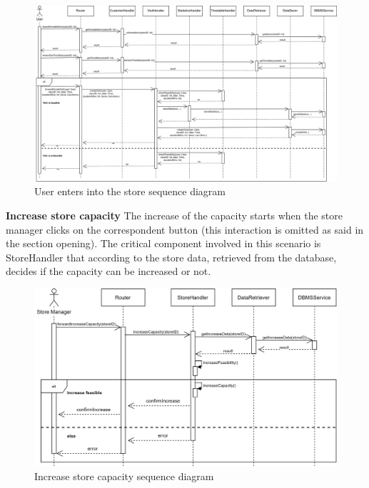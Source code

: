 \documentclass[]{article}
\begin{document}
	\begin{figure}[H]
		\centering
		\includegraphics[scale=0.57]{ComponentView/bookAVisitRuntimeView.png}
		\caption{User enters into the store sequence diagram}
	\end{figure}
	
	
	\noindent
	\textbf{Increase store capacity}
	\newline \newline
	The increase of the capacity starts when the store manager clicks on the correspondent button (this interaction is omitted as said in the section opening). The critical component involved in this scenario is StoreHandler that according to the store data, retrieved from the database, decides if the capacity can be increased or not.
	\medskip
	\begin{figure}[H]
		\centering
		\includegraphics[scale=0.65]{increaseSequence}
		\caption{Increase store capacity sequence diagram}
	\end{figure}
	
	
	\newpage
	
	
\end{document}

